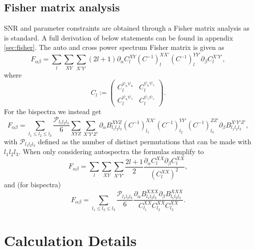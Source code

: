 \documentclass[11pt]{article} %
\begin{document}
\subsection{Fisher matrix analysis}
SNR and parameter constraints are obtained through a Fisher matrix analysis as is standard. A full derivation of below statements can be found in appendix \ref{sec:fisher}. The auto and cross power spectrum Fisher matrix is given as
\begin{equation*}
    F_{\alpha\beta} = \sum_{l} \sum_{XY}\sum_{X'Y'}(2l+1)\partial_\alpha C_l^{XY} (C^{-1})_l^{XX'}(C^{-1})_l^{YY'} \partial_\beta C^{X'Y'}_l,
\end{equation*}
where
\begin{equation*}
    C_{l} := \begin{pmatrix}
        C^{\psi_\kappa\psi_\kappa}_l & C^{\psi_\kappa\psi_\gamma}_l \\
        C^{\psi_\kappa\psi_\gamma}_l & C^{\psi_\gamma\psi_\gamma}_l
    \end{pmatrix}.
\end{equation*}
For the bispectra we instead get 
\begin{equation*}
    F_{\alpha\beta} = \sum_{l_1 \leq l_2 \leq l_3} \frac{\mathcal P _{l_1l_2l_3}}{6}
    \sum_{XYZ}\sum_{X'Y'Z'} 
    \partial_\alpha B^{X Y Z}_{l_1 l_2 l_3} 
    (C^{-1})^{X X'}_{l_1}
    (C^{-1})^{Y Y'}_{l_2}
    (C^{-1})^{Z Z'}_{l_3}
    \partial_\beta B^{X' Y' Z'}_{l_1 l_2 l_3},
\end{equation*}
with $\mathcal P_{l_1l_2l_3}$ defined as the number of distinct permutations that can be made with $l_1l_2l_3$. When only considering autospectra the formulas simplify to
\begin{equation*}
    F_{\alpha\beta} = \sum_{l} \sum_{XY}\sum_{X'Y'}\frac{2l+1}{2}\frac{\partial_{\alpha}C_l^{XX} \partial_\beta C^{XX}_l}{(C_l^{XX})^2},
\end{equation*}
and (for bispectra)
\begin{equation*}
    F_{\alpha\beta} = \sum_{l_1 \leq l_2 \leq l_3} \frac{\mathcal P _{l_1l_2l_3}}{6}
    \frac{\partial_\alpha B^{X X X}_{l_1 l_2 l_3} 
    \partial_\beta B^{XXX}_{l_1 l_2 l_3}}{C^{XX}_{l_1}C^{XX}_{l_2}C^{XX}_{l_3}}.
\end{equation*}



\section{Calculation Details}\label{sec:calcdetails}
\end{document}
